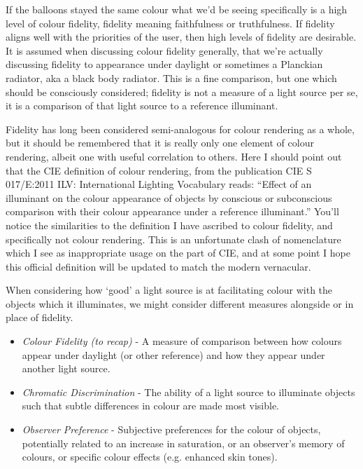 If the balloons stayed the same colour what we'd be seeing specifically is a high level of colour fidelity, fidelity meaning faithfulness or truthfulness. If fidelity aligns well with the priorities of the user, then high levels of fidelity are desirable. It is assumed when discussing colour fidelity generally, that we're actually discussing fidelity to appearance under daylight or sometimes a Planckian radiator, aka a black body radiator. This is a fine comparison, but one which should be consciously considered; fidelity is not a measure of a light source per se, it is a comparison of that light source to a reference illuminant.

Fidelity has long been considered semi-analogous for colour rendering as a whole, but it should be remembered that it is really only one element of colour rendering, albeit one with useful correlation to others. Here I should point out that the \gls{CIE} definition of colour rendering, from the publication \gls{CIE} S 017/E:2011 ILV: International Lighting Vocabulary \citep{cie_cie_2011} reads: ``Effect of an illuminant on the colour appearance of objects by conscious or subconscious comparison with their colour appearance under a reference illuminant.'' You'll notice the similarities to the definition I have ascribed to colour fidelity, and specifically not colour rendering. This is an unfortunate clash of nomenclature which I see as inappropriate usage on the part of \gls{CIE}, and at some point I hope this official definition will be updated to match the modern vernacular.

When considering how `good' a light source is at facilitating colour with the objects which it illuminates, we might consider different measures alongside or in place of fidelity.

\begin{itemize}
\item \emph{Colour Fidelity (to recap)} - A measure of comparison between how colours appear under daylight (or other reference) and how they appear under another light source. %
\item \emph{Chromatic Discrimination} - The ability of a light source to illuminate objects such that subtle differences in colour are made most visible. %
\item \emph{Observer Preference} - Subjective preferences for the colour of objects, potentially related to an increase in saturation, or an observer's memory of colours, or specific colour effects (e.g. enhanced skin tones). %
\end{itemize}

